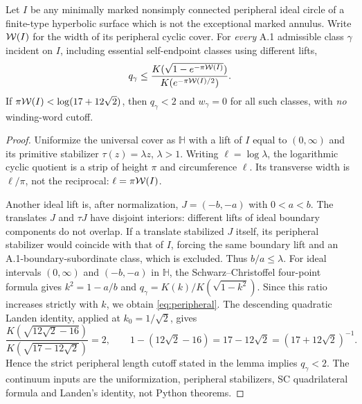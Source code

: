 \begin{lemma}
\label{lem:peripheral}
Let $I$ be any minimally
marked nonsimply connected
peripheral ideal circle
of a finite-type hyperbolic
surface which is not the
exceptional marked annulus.
Write $\mathcal W(I)$ for the
width of its peripheral
cyclic cover.  For \emph{every}
A.1 admissible class $\gamma$
incident on $I$, including
essential self-endpoint
classes using different lifts,
\begin{equation}\label{eq:peripheral}
 q_\gamma\le
 \frac{K(\sqrt{1-e^{-\pi\mathcal W(I)}})}
 {K(e^{-\pi\mathcal W(I)/2})}.
\end{equation}
If $\pi\mathcal W(I)<\log(17+12\sqrt2)$,
then $q_\gamma<2$ and
$w_\gamma=0$ for all such
classes, with \emph{no}
winding-word cutoff.
\end{lemma}
\begin{proof}
Uniformize the universal
cover as $\mathbb H$ with a
lift of $I$ equal to
$(0,\infty)$ and its
primitive stabilizer
$\tau(z)=\lambda z$,
$\lambda>1$.  Writing
$\ell=\log\lambda$,
the logarithmic cyclic
quotient is a strip
of height $\pi$ and
circumference $\ell$.
Its transverse width is
$\ell/\pi$, not the reciprocal:
$\ell=\pi\mathcal W(I)$.

Another ideal lift
is, after normalization,
$J=(-b,-a)$ with $0<a<b$.
The translates $J$ and
$\tau J$ have disjoint
interiors: different
lifts of ideal boundary
components do not overlap.
If a translate stabilized
$J$ itself, its peripheral
stabilizer would coincide
with that of $I$,
forcing the same
boundary lift and an
A.1-boundary-subordinate
class, which is excluded.
Thus $b/a\le\lambda$.
For ideal intervals
$(0,\infty)$ and $(-b,-a)$
in $\mathbb H$, the
Schwarz--Christoffel
four-point formula gives
$k^2=1-a/b$ and
$q_\gamma=K(k)/K(\sqrt{1-k^2})$.
Since this ratio increases
strictly with $k$, we
obtain \eqref{eq:peripheral}.
The descending quadratic
Landen identity, applied
at $k_0=1/\sqrt2$, gives
\[
 \frac{K(\sqrt{12\sqrt2-16})}
      {K(\sqrt{17-12\sqrt2})}=2,
 \qquad
 1-(12\sqrt2-16)=17-12\sqrt2
  =(17+12\sqrt2)^{-1}.
\]
Hence the strict peripheral
length cutoff stated in
the lemma implies
$q_\gamma<2$.
The continuum inputs are
the uniformization,
peripheral stabilizers,
SC quadrilateral formula
and Landen's identity,
not Python theorems.
\end{proof}


